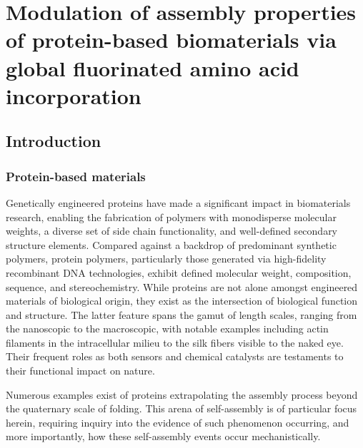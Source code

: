 \chapter{Modulation of assembly properties of protein-based biomaterials via
global fluorinated amino acid incorporation}

\section{Introduction}

\subsection{Protein-based materials}


Genetically engineered proteins have made a significant impact in biomaterials
research, enabling the fabrication of polymers with monodisperse molecular
weights, a diverse set of side chain functionality, and well-defined secondary
structure elements.\cite{
Yoshikawa1994,Wang2001,Rabotyagova2009,Martin2009,Dinerman2002,Megeed2002,Haider2004,Wright2002,Banta2010,Link2003,Straley2009,Rabotyagova2011}
Compared against a backdrop of predominant synthetic polymers, protein polymers,
particularly those generated via high-fidelity recombinant DNA technologies,
exhibit defined molecular weight, composition, sequence, and
stereochemistry.\cite{} While proteins are not alone amongst engineered
materials of biological origin, they exist as the intersection of biological
function and structure. The latter feature spans the gamut of length scales,
ranging from the nanoscopic to the macroscopic, with notable examples including
actin filaments in the intracellular milieu to the silk fibers visible to the
naked eye.\cite{Rabotyagova2009} Their frequent roles as both sensors and
chemical catalysts are testaments to their functional impact on nature.


Numerous examples exist of proteins extrapolating the assembly process beyond
the quaternary scale of folding. This arena of self-assembly is of particular
focus herein, requiring inquiry into the evidence of such phenomenon occurring,
and more importantly, how these self-assembly events occur mechanistically.

